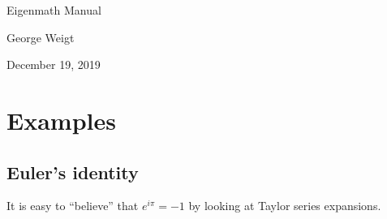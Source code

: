 \documentclass[11pt]{article}
\begin{document}
\begin{center}
{\LARGE Eigenmath Manual}

George Weigt

December 19, 2019
\end{center}

\tableofcontents

\newpage




































\section{Examples}















\subsection{Euler's identity}
It is easy to ``believe'' that $e^{i\pi}=-1$ by looking at Taylor series expansions.
\end{document}

